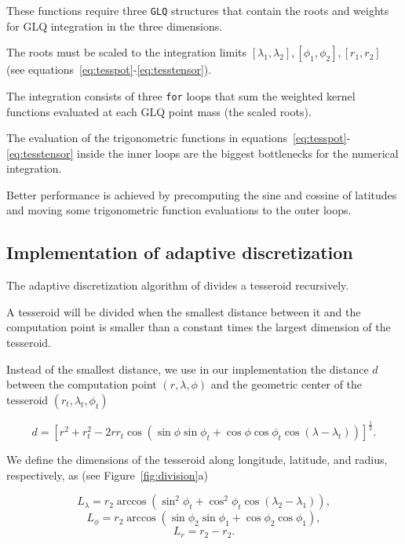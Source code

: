 \documentclass[paper,twocolumn]{geophysics}
\begin{document}
These functions require three \texttt{GLQ} structures that contain the roots
and weights for GLQ integration in the three dimensions.

The roots must be scaled to the
integration limits $[\lambda_1, \lambda_2], [\phi_1, \phi_2], [r_1, r_2]$
(see equations~\ref{eq:tesspot}-\ref{eq:tesstensor}).

The integration consists of three \texttt{for} loops that sum the weighted
kernel functions evaluated at each GLQ point mass (the scaled roots).

The evaluation of the trigonometric functions in
equations~\ref{eq:tesspot}-\ref{eq:tesstensor} inside the inner loops
are the biggest bottlenecks for the numerical integration.

Better performance is achieved by
precomputing the sine and cossine of latitudes
and moving some trigonometric function
evaluations to the outer loops.



\subsection{Implementation of adaptive discretization}


The adaptive discretization algorithm of \citet{Li2011}
divides a tesseroid recursively.

A tesseroid will be divided when the smallest distance between it and the
computation point is smaller than a constant times the largest dimension of the
tesseroid.

Instead of the smallest distance,
we use in our implementation
the distance $d$ between
the computation point $(r, \lambda, \phi)$
and the geometric center of the tesseroid
$(r_t, \lambda_t, \phi_t)$

\begin{equation}
    d = \left[
        r^2 + r_t^2 - 2 r r_t
        \cos(\sin\phi\sin\phi_t + \cos\phi\cos\phi_t
            \cos(\lambda - \lambda_t))
        \right]^{\frac{1}{2}}.
    \label{eq:distance}
\end{equation}

We define the dimensions of the tesseroid
along longitude, latitude, and radius, respectively, as
(see Figure~\ref{fig:division}a)

\begin{equation}
    L_\lambda = r_2 \arccos(\sin^2\phi_t +
        \cos^2\phi_t\cos(\lambda_2 - \lambda_1)),
    \label{eq:sizelon}
\end{equation}
\begin{equation}
    L_\phi = r_2 \arccos(\sin\phi_2\sin\phi_1 + \cos\phi_2\cos\phi_1),
\end{equation}
\begin{equation}
    L_r = r_2 - r_2.
    \label{eq:sizer}
\end{equation}
\end{document}
